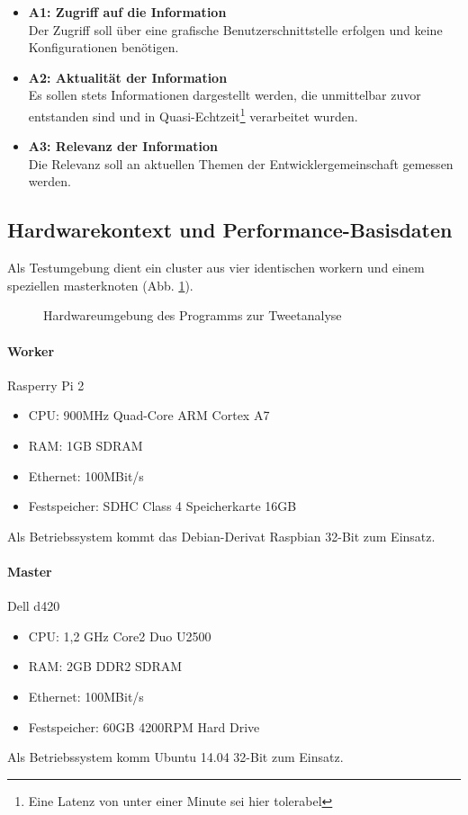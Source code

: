 \begin{itemize}
	\item \textbf{A1: Zugriff auf die Information}\\
	Der Zugriff soll über eine grafische Benutzerschnittstelle erfolgen und keine Konfigurationen benötigen.
	\item \textbf{A2: Aktualität der Information}\\
	Es sollen stets Informationen dargestellt werden, die unmittelbar zuvor entstanden sind und in Quasi-Echtzeit\footnote{Eine Latenz von unter einer Minute sei hier tolerabel} verarbeitet wurden.
	\item \textbf{A3: Relevanz der Information}\\
	Die Relevanz soll an aktuellen Themen der Entwicklergemeinschaft gemessen werden.
\end{itemize}

\subsection{Hardwarekontext und Performance-Basisdaten}

Als Testumgebung dient ein \gls{cluster} aus vier identischen \gls{worker}n und einem speziellen \gls{master}knoten (Abb. \ref{figure:versuchsaufbau}).

\begin{figure}[h]
	\centering
  
	\caption{Hardwareumgebung des Programms zur Tweetanalyse}
	\label{figure:versuchsaufbau}
\end{figure}

\paragraph{Worker}
Rasperry Pi 2
\begin{itemize}
	\item CPU: 900MHz Quad-Core ARM Cortex A7
	\item RAM: 1GB SDRAM
	\item Ethernet: 100MBit/s
	\item Festspeicher: SDHC Class 4 Speicherkarte 16GB
\end{itemize}
Als Betriebssystem kommt das Debian-Derivat Raspbian\cite{raspbian} 32-Bit zum Einsatz.

\paragraph{Master}
Dell d420
\begin{itemize}
	\item CPU: 1,2 GHz Core2 Duo U2500
	\item RAM: 2GB DDR2 SDRAM
	\item Ethernet: 100MBit/s
	\item Festspeicher: 60GB 4200RPM Hard Drive
\end{itemize}
Als Betriebssystem komm Ubuntu\cite{ubuntu} 14.04 32-Bit zum Einsatz.

